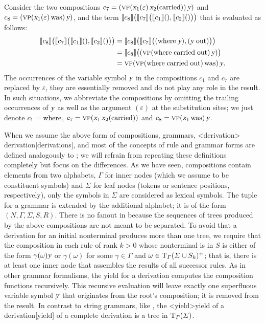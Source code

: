 \documentclass[../../document.tex]{subfiles}
\begin{document}
\begin{example}
        Consider the two compositions \(c_7 = (\textsc{vp}(\textsl{x}_1(\varepsilon) \, \textsl{x}_2(\text{carried}))\,\textsl{y})\) and \(c_8 = (\textsc{vp}(\textsl{x}_1(\varepsilon) \, \text{was})\,\textsl{y})\), and the term \(\llbracket c_8\rrbracket\big( \llbracket c_7\rrbracket\big(\llbracket c_1\rrbracket(), \llbracket c_2\rrbracket()\big) \big)\) that is evaluated as follows:
        \begin{align*}
            \llbracket c_8\rrbracket\big( \llbracket c_7\rrbracket\big(\llbracket c_1\rrbracket(), \llbracket c_2\rrbracket()\big) \big)
            &= \llbracket c_8\rrbracket\big( \llbracket c_7\rrbracket\big((\text{where} \; \textsl{y}), (\textsl{y} \; \text{out})\big) \big)\\
            &= \llbracket c_8\rrbracket\big( (\textsc{vp}(\text{where} \; \text{carried} \; \text{out} )\,\textsl{y})  \big)\\
            &= \textsc{vp} (\textsc{vp}(\text{where} \; \text{carried} \;\text{out} )\, \text{was})\,\textsl{y}\text{.}
        \end{align*}
        The occurrences of the variable symbol \(\textsl{y}\) in the compositions \(c_1\) and \(c_7\) are replaced by \(\varepsilon\), they are essentially removed and do not play any role in the result.
        In such situations, we abbreviate the compositions by omitting the trailing occurrences of $\textsl{y}$ as well as the argument \((\varepsilon)\) at the substitution sites; we just denote \(c_1 = \text{where}\), \(c_7 = \textsc{vp}(\textsl{x}_1 \, \textsl{x}_2(\text{carried}))\) and \(c_8 = \textsc{vp}(\textsl{x}_1\, \text{was})\,\textsl{y}\).
        \\\null\hfill\exampleqed
    \end{example}

    When we assume the above form of compositions,  grammars, <derivation>{ derivation}[derivations], and most of the concepts of rule and grammar forms are defined analogously to ; we will refrain from repeating these definitions completely but focus on the differences.
    As we have seen,  compositions contain elements from two alphabets, \(\varGamma\) for inner nodes (which we assume to be constituent symbols) and  \(\varSigma\) for leaf nodes (tokens or sentence positions, respectively), only the symbols in \(\varSigma\) are considered as lexical symbols.
    The tuple for a  grammar is extended by the additional alphabet; it is of the form \((N, \varGamma, \varSigma, S, R)\).
    There is no fanout in  because the sequences of trees produced by the above compositions are not meant to be separated.
    To avoid that a derivation for an initial nonterminal produces more than one tree, we require that the composition in each rule of rank \(k>0\) whose  nonterminal is in \(S\) is either of the form \(\gamma( \omega) \textsl{y}\) or \(\gamma(\omega)\) for some \(\gamma \in \varGamma\) and \(\omega \in \operatorname{T}_\varGamma(\varSigma \cup S_k)^+\); that is, there is at least one inner node that assembles the results of all successor rules.
    As in other grammar formalisms, the yield for a derivation computes the composition functions recursively.
    This recursive evaluation will leave exactly one superfluous variable symbol \(\textsl{y}\) that originates from the root's composition; it is removed from the result.
    In contrast to string grammars, like , the <yield>{yield of a  derivation}[yield] of a complete derivation is a tree in \(\operatorname{T}_\varGamma(\varSigma)\).
\end{document}
